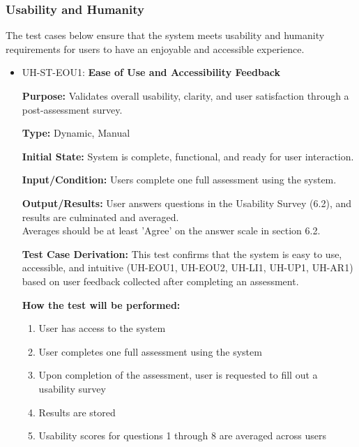 \documentclass[12pt, titlepage]{article}
\begin{document}
\subsubsection{Usability and Humanity}
\hspace{2em}The test cases below ensure that the system meets usability and humanity
requirements for users to have an enjoyable and accessible experience.

\begin{itemize}
  \item UH-ST-EOU1: \textbf{Ease of Use and Accessibility Feedback}
  \begin{mdframed}[linewidth=0.5mm]
      \textbf{Purpose:} Validates overall usability, clarity, and user satisfaction through a post-assessment survey. \par
      \textbf{Type:} Dynamic, Manual \par
      \textbf{Initial State:} System is complete, functional, and ready for user interaction. \par
      \textbf{Input/Condition:} Users complete one full assessment using the system. \par
      \textbf{Output/Results:} User answers questions in the Usability Survey (6.2), and results are culminated and averaged.\\
      Averages should be at least 'Agree' on the answer scale in section 6.2. \par
      \textbf{Test Case Derivation:} This test confirms that the system is easy to use, accessible, and intuitive (UH-EOU1, UH-EOU2, UH-LI1, UH-UP1, UH-AR1) based on user feedback collected after completing an assessment. \par
      \textbf{How the test will be performed:}
      \begin{enumerate}[noitemsep]
        \item User has access to the system
        \item User completes one full assessment using the system
        \item Upon completion of the assessment, user is requested to fill out a usability survey
        \item Results are stored
        \item Usability scores for questions 1 through 8 are averaged across users
      \end{enumerate}
  \end{mdframed}


\end{itemize}
\end{document}
